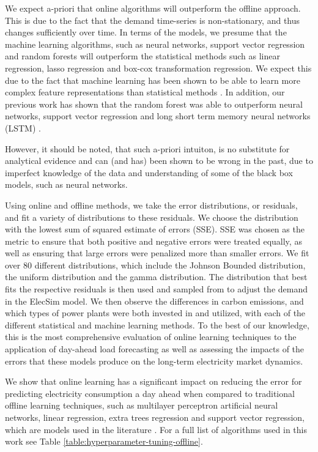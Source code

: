 We expect a-priori that online algorithms will outperform the offline approach. This is due to the fact that the demand time-series is non-stationary, and thus changes sufficiently over time. In terms of the models, we presume that the machine learning algorithms, such as neural networks, support vector regression and random forests will outperform the statistical methods such as linear regression, lasso regression and box-cox transformation regression. We expect this due to the fact that machine learning has been shown to be able to learn more complex feature representations than statistical methods \cite{Singh2012}. In addition, our previous work has shown that the random forest was able to outperform neural networks, support vector regression and long short term memory neural networks (LSTM) \cite{Kell2018}. 

However, it should be noted, that such a-priori intuiton, is no substitute for analytical evidence and can (and has) been shown to be wrong in the past, due to imperfect knowledge of the data and understanding of some of the black box models, such as neural networks.



Using online and offline methods, we take the error distributions, or residuals, and fit a variety of distributions to these residuals. We choose the distribution with the lowest sum of squared estimate of errors (SSE). SSE was chosen as the metric to ensure that both positive and negative errors were treated equally, as well as ensuring that large errors were penalized more than smaller errors. We fit over 80 different distributions, which include the Johnson Bounded distribution, the uniform distribution and the gamma distribution. The distribution that best fits the respective residuals is then used and sampled from to adjust the demand in the ElecSim model. We then observe the differences in carbon emissions, and which types of power plants were both invested in and utilized, with each of the different statistical and machine learning methods. To the best of our knowledge, this is the most comprehensive evaluation of online learning techniques to the application of day-ahead load forecasting as well as assessing the impacts of the errors that these models produce on the long-term electricity market dynamics.





We show that online learning has a significant impact on reducing the error for predicting electricity consumption a day ahead when compared to traditional offline learning techniques, such as multilayer perceptron artificial neural networks, linear regression, extra trees regression and support vector regression, which are models used in the literature \cite{Lu1993, Ahmad2017, Chen2004}. For a full list of algorithms used in this work see Table \ref{table:hyperparameter-tuning-offline}.

